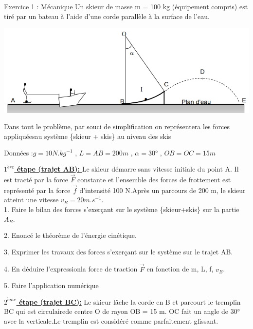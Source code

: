 \documentclass[12pt, french]{article}
\begin{document}
\begin{center}
\end{center}


\begin{Box2}{Exercice 1 : Mécanique }
Un skieur de masse m = 100 kg (équipement compris) est tiré par un bateau à l'aide d'une corde parallèle à la surface de l'eau. 
\begin{center}
    \includegraphics[width=1\textwidth, height =0.2\textwidth ]{./img/img01.png}
  \end{center}
Dans tout le problème, par souci de simplification on représentera les forces appliquéesau système \{skieur + skis\}  au niveau des skis

Données :$g = 10 N.kg^{-1}$ , $L = AB = 200 m$ ,  $\alpha=$30° ,  $OB = OC = 15 m$

   \underline{ \textbf{ $1^{\grave{e}re}$ étape (trajet AB): } } Le skieur démarre sans vitesse initiale du point A. Il est tracté par la force $\vec{F}$ constante et l’ensemble des forces de frottement est représenté par la force $\vec{f}$ d’intensité 100 N.Après un parcours de 200 m, le skieur atteint une vitesse $v_B= 20 m.s^{-1}$. 
\vspace{0.3cm}
\\1. Faire le bilan des forces s’exerçant sur le système \{skieur+skis\} sur la partie $A_B$.

2. Enoncé le théorème de l’énergie cinétique.

3. Exprimer les travaux des forces s’exerçant sur le système sur le trajet AB.

4. En déduire l’expressionla force de traction $\vec{F}$ en fonction de m, L, f, $v_B$.

5. Faire l’application numérique

\vspace{0.2cm}

   \underline{  \textbf{ $2^{\grave{e}me}$ étape (trajet BC):}} Le skieur lâche la corde en B et parcourt le tremplin BC qui est circulairede centre O de rayon OB = 15 m. OC fait un angle de 30° avec la verticale.Le tremplin est considéré comme parfaitement glissant.


\end{Box2}
\end{document}
